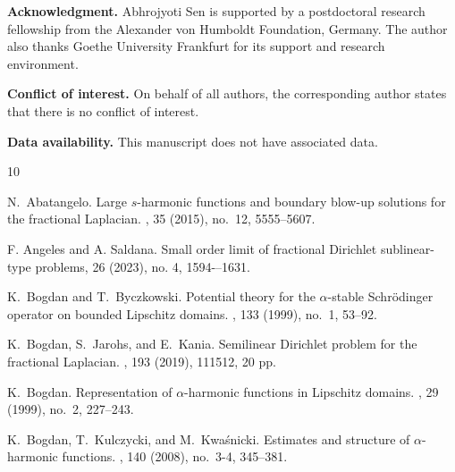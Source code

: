 \documentclass[notitlepage,11pt,reqno]{amsart}
\theoremstyle{definition}
\numberwithin{equation}{section}
\begin{document}
\noindent\textbf{Acknowledgment.}
Abhrojyoti Sen is supported by a postdoctoral research fellowship from the Alexander von Humboldt Foundation, Germany. The author also thanks Goethe University Frankfurt for its support and research environment.

\bigskip
\noindent\textbf{Conflict of interest.} On behalf of all authors, the corresponding author states that there is no conflict of interest.

\bigskip
\noindent\textbf{Data availability.} This manuscript does not have associated data.

\begin{thebibliography}{10}




N.~Abatangelo.
\newblock Large {$s$}-harmonic functions and boundary blow-up solutions for the
  fractional {L}aplacian.
, 35 (2015), no.~12, 5555--5607.

F. Angeles and A. Saldana. 
\newblock Small order limit of fractional Dirichlet sublinear-type problems,
  26 (2023), no. 4, 1594-–1631.  



K.~Bogdan and T.~Byczkowski.
\newblock Potential theory for the {$\alpha$}-stable {S}chr\"odinger operator
  on bounded {L}ipschitz domains.
, 133 (1999), no.~1, 53--92.

K.~Bogdan, S.~Jarohs, and E.~Kania.
\newblock Semilinear {D}irichlet problem for the fractional {L}aplacian.
, 193 (2019), 111512, 20 pp.


K.~Bogdan.
\newblock Representation of {$\alpha$}-harmonic functions in {L}ipschitz domains.
, 29 (1999), no.~2, 227--243.

K.~Bogdan, T.~Kulczycki, and M.~Kwa\'snicki.
\newblock Estimates and structure of {$\alpha$}-harmonic functions.
, 140 (2008), no.~3-4, 345--381.


\end{thebibliography}
\end{document}
